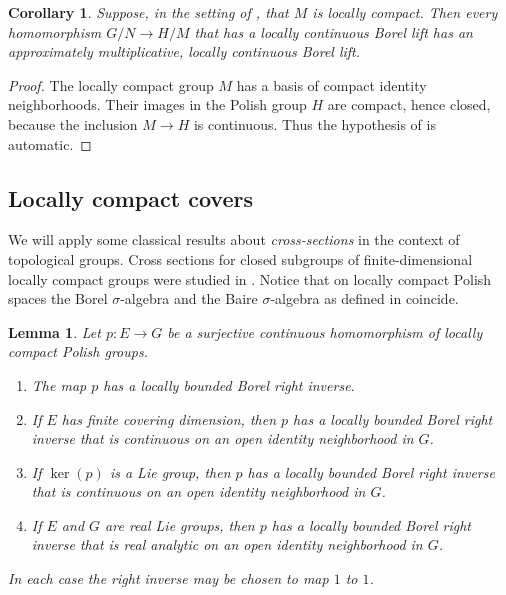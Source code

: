\documentclass[12pt]{amsart}
\newtheorem{lemma}[theorem]{Lemma}
\newtheorem{corollary}[theorem]{Corollary}
\theoremstyle{definition}
\begin{document}
\begin{corollary}
\label{Corollary:locally-compact} Suppose, in the setting of %
, that $M$ is locally
compact. Then every homomorphism $G/N\rightarrow H/M$ that has a locally
continuous Borel lift has an approximately multiplicative, locally
continuous Borel lift.
\end{corollary}

\begin{proof}
The locally compact group $M$ has a basis of compact identity neighborhoods.
Their images in the Polish group $H$ are compact, hence closed, because the
inclusion $M\rightarrow H$ is continuous. Thus the hypothesis of %
 is automatic.
\end{proof}

\subsection{Locally compact covers}

We will apply some classical results about \emph{cross-sections} in the
context of topological groups. Cross sections for closed subgroups of
finite-dimensional locally compact groups were studied in \cite%
{mostert_local_1953,nagami_cross_1963,nagami_dimension-theoretical_1962,karube_local_1958,serre_extensions_1952,mackey_induced_1952}%
. Notice that on locally compact Polish spaces the Borel $\sigma $-algebra
and the Baire $\sigma $-algebra as defined in \cite{kehlet_cross_1984}
coincide.

\begin{lemma}
\label{Lemma:locally-compact-sections} Let $p:E\rightarrow G$ be a
surjective continuous homomorphism of locally compact Polish groups.

\begin{enumerate}
\item The map $p$ has a locally bounded Borel right inverse.

\item If $E$ has finite covering dimension, then $p$ has a locally bounded
Borel right inverse that is continuous on an open identity neighborhood in $%
G $.

\item If $\ker (p)$ is a Lie group, then $p$ has a locally bounded Borel
right inverse that is continuous on an open identity neighborhood in $G$.

\item If $E$ and $G$ are real Lie groups, then $p$ has a locally bounded
Borel right inverse that is real analytic on an open identity neighborhood
in $G$.
\end{enumerate}

In each case the right inverse may be chosen to map $1$ to $1$.
\end{lemma}
\end{document}
